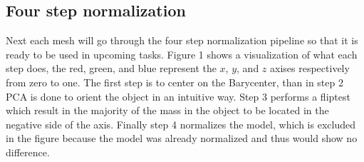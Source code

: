 \documentclass{bigdata}
\begin{document}
\subsection{Four step normalization}

Next each mesh will go through the four step normalization pipeline so that it is ready to be used in upcoming tasks. Figure 1 shows a visualization of what each step does, the red, green, and blue represent the $x$, $y$, and $z$ axises respectively from zero to one. The first step is to center on the Barycenter, than in step 2 PCA is done to orient the object in an intuitive way. Step 3 performs a fliptest which result in the majority of the mass in the object to be located in the negative side of the axis. Finally step 4 normalizes the model, which is excluded in the figure because the model was already normalized and thus would show no difference.
\end{document}
